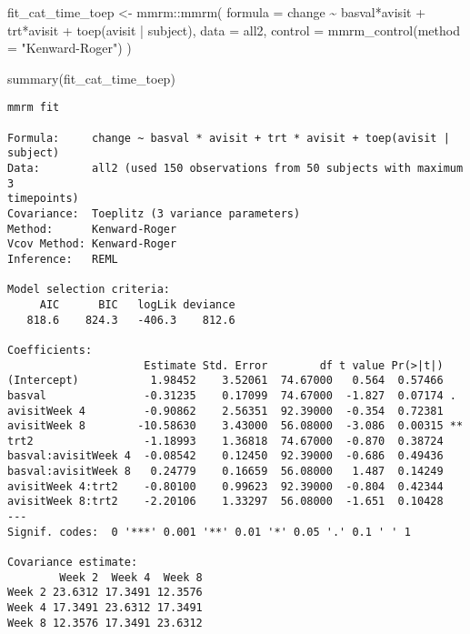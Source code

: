 \documentclass[
  letterpaper,
  DIV=11,
  numbers=noendperiod]{scrreprt}
\newenvironment{Shaded}{\begin{snugshade}}{\end{snugshade}}
\newcommand{\AttributeTok}[1]{\textcolor[rgb]{0.40,0.45,0.13}{#1}}
\newcommand{\FunctionTok}[1]{\textcolor[rgb]{0.28,0.35,0.67}{#1}}
\newcommand{\NormalTok}[1]{\textcolor[rgb]{0.00,0.23,0.31}{#1}}
\newcommand{\OtherTok}[1]{\textcolor[rgb]{0.00,0.23,0.31}{#1}}
\newcommand{\SpecialCharTok}[1]{\textcolor[rgb]{0.37,0.37,0.37}{#1}}
\newcommand{\StringTok}[1]{\textcolor[rgb]{0.13,0.47,0.30}{#1}}
\begin{document}
\begin{Shaded}
\begin{Highlighting}[]
\NormalTok{fit\_cat\_time\_toep }\OtherTok{\textless{}{-}}\NormalTok{ mmrm}\SpecialCharTok{::}\FunctionTok{mmrm}\NormalTok{(}
  \AttributeTok{formula =}\NormalTok{ change }\SpecialCharTok{\textasciitilde{}}\NormalTok{ basval}\SpecialCharTok{*}\NormalTok{avisit }\SpecialCharTok{+}\NormalTok{ trt}\SpecialCharTok{*}\NormalTok{avisit }\SpecialCharTok{+} \FunctionTok{toep}\NormalTok{(avisit }\SpecialCharTok{|}\NormalTok{ subject),}
  \AttributeTok{data =}\NormalTok{ all2,}
  \AttributeTok{control =} \FunctionTok{mmrm\_control}\NormalTok{(}\AttributeTok{method =} \StringTok{"Kenward{-}Roger"}\NormalTok{)}
\NormalTok{)}

\FunctionTok{summary}\NormalTok{(fit\_cat\_time\_toep)}
\end{Highlighting}
\end{Shaded}

\begin{verbatim}
mmrm fit

Formula:     change ~ basval * avisit + trt * avisit + toep(avisit | subject)
Data:        all2 (used 150 observations from 50 subjects with maximum 3 
timepoints)
Covariance:  Toeplitz (3 variance parameters)
Method:      Kenward-Roger
Vcov Method: Kenward-Roger
Inference:   REML

Model selection criteria:
     AIC      BIC   logLik deviance 
   818.6    824.3   -406.3    812.6 

Coefficients: 
                     Estimate Std. Error        df t value Pr(>|t|)   
(Intercept)           1.98452    3.52061  74.67000   0.564  0.57466   
basval               -0.31235    0.17099  74.67000  -1.827  0.07174 . 
avisitWeek 4         -0.90862    2.56351  92.39000  -0.354  0.72381   
avisitWeek 8        -10.58630    3.43000  56.08000  -3.086  0.00315 **
trt2                 -1.18993    1.36818  74.67000  -0.870  0.38724   
basval:avisitWeek 4  -0.08542    0.12450  92.39000  -0.686  0.49436   
basval:avisitWeek 8   0.24779    0.16659  56.08000   1.487  0.14249   
avisitWeek 4:trt2    -0.80100    0.99623  92.39000  -0.804  0.42344   
avisitWeek 8:trt2    -2.20106    1.33297  56.08000  -1.651  0.10428   
---
Signif. codes:  0 '***' 0.001 '**' 0.01 '*' 0.05 '.' 0.1 ' ' 1

Covariance estimate:
        Week 2  Week 4  Week 8
Week 2 23.6312 17.3491 12.3576
Week 4 17.3491 23.6312 17.3491
Week 8 12.3576 17.3491 23.6312
\end{verbatim}
\end{document}
